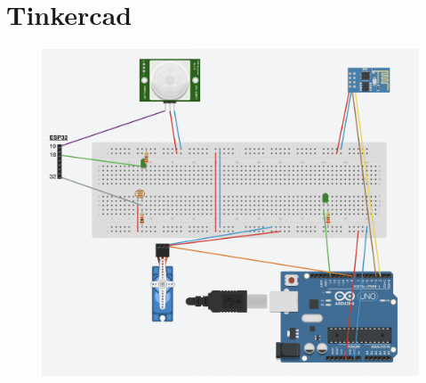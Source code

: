 \documentclass[12pt]{article}
\begin{document}
\newpage


\section{Tinkercad}

\begin{figure}[H]
    \includegraphics[width=17cm]{tinkercad.png}
\end{figure}
\end{document}
